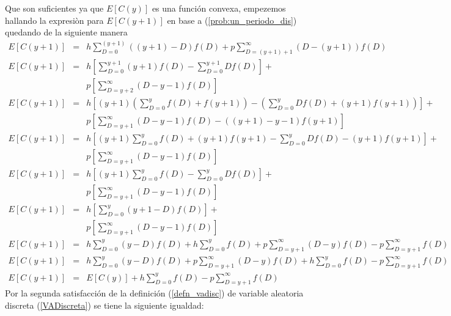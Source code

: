 Que son suficientes ya que $E[C(y)]$ es una función convexa, empezemos hallando la expresiòn para $E[C(y+1)]$ en base a (\ref{prob:un_periodo_dis}) quedando de la siguiente manera
\begin{eqnarray}
	E[C(y+1)] &=& h \sum\limits_{D = 0}^{(y+1)}((y+1)-D)f(D) + p \sum\limits_{D = (y+1)+1}^{\infty} (D-(y+1))f(D) \nonumber \\
	E[C(y+1)] &=& h \left[ \sum\limits_{D = 0}^{y+1}(y+1)f(D) - \sum\limits_{D = 0}^{y+1}Df(D) \right] + \nonumber \\
	 & & p \left[ \sum\limits_{D = y+2}^{\infty} (D-y-1)f(D) \right] \nonumber \\
	E[C(y+1)] &=& h \left[ (y+1) \left( \sum\limits_{D = 0}^{y}f(D)+f(y+1) \right) - \left(\sum\limits_{D = 0}^{y} Df(D) + (y+1)f(y+1) \right) \right] + \nonumber \\
	 & & p \left[ \sum\limits_{D = y+1}^{\infty}(D-y-1)f(D)-( (y+1)-y-1 )f(y+1) \right] \nonumber \\
	 E[C(y+1)] &=& h \left[ (y+1) \sum\limits_{D = 0}^{y} f(D) + (y+1)f(y+1) - \sum\limits_{D = 0}^{y} Df(D) - (y+1)f(y+1) \right] + \nonumber \\
	  & & p \left[ \sum\limits_{D = y+1}^{\infty} (D-y-1)f(D) \right] \nonumber \\
	 E[C(y+1)] &=& h \left[ (y+1) \sum\limits_{D = 0}^{y} f(D) - \sum\limits_{D = 0}^{y} Df(D) \right] + \nonumber \\
	  & & p \left[ \sum\limits_{D = y+1}^{\infty} (D-y-1)f(D) \right] \nonumber \\
	E[C(y+1)] &=& h \left[ \sum\limits_{D = 0}^{y} (y+1-D) f(D) \right] + \nonumber \\
	  & & p \left[ \sum\limits_{D = y+1}^{\infty} (D-y-1)f(D) \right] \nonumber \\
	E[C(y+1)] &=& h \sum\limits_{D = 0}^{y}(y-D)f(D) + h \sum\limits_{D = 0}^{y}f(D) + p \sum\limits_{D = y+1}^{\infty}(D-y)f(D) - p \sum\limits_{D = y+1}^{\infty} f(D) \nonumber
\end{eqnarray}
\begin{eqnarray}
	\label{seguimos_res}
	E[C(y+1)] &=& h \sum\limits_{D = 0}^{y} (y-D) f(D) + p \sum\limits_{D = y+1}^{\infty} (D-y)f(D) + h \sum\limits_{D = 0}^{y} f(D) - p \sum\limits_{D = y+1}^{\infty} f(D) \nonumber \\
	E[C(y+1)] &=& E[C(y)] + h \sum\limits_{D = 0}^{y} f(D) - p \sum\limits_{D = y+1}^{\infty} f(D)
\end{eqnarray}
Por la segunda satisfacción de la definición (\ref{defn_vadisc}) de variable aleatoria discreta (\ref{VADiscreta}) se tiene la siguiente igualdad:
